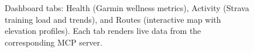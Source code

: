 \begin{figure}[ht]
\centering
{}
\caption[Dashboard tabs overview]{Dashboard tabs: Health (Garmin wellness metrics), Activity (Strava training load and trends), and Routes (interactive map with elevation profiles). Each tab renders live data from the corresponding MCP server.}\label{fig:screenshot_dashboards}
\end{figure}
